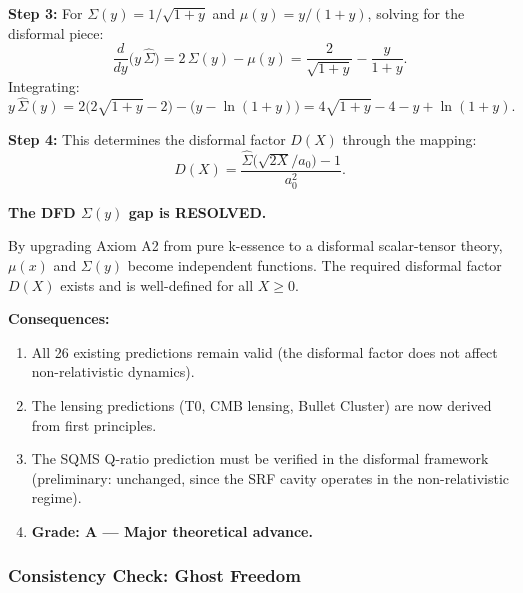 \documentclass[11pt]{article}
\newcommand{\aM}{a_0}
\begin{document}
\textbf{Step 3:} For $\Sigma(y) = 1/\sqrt{1+y}$ and $\mu(y) = y/(1+y)$,
solving for the disformal piece:
\begin{equation}
  \frac{d}{dy}\bigl(y\,\hat{\Sigma}\bigr)
  = 2\,\Sigma(y) - \mu(y)
  = \frac{2}{\sqrt{1+y}} - \frac{y}{1+y}.
\end{equation}
Integrating:
\begin{equation}
  y\,\hat{\Sigma}(y) = 2\bigl(2\sqrt{1+y} - 2\bigr) - \bigl(y - \ln(1+y)\bigr)
  = 4\sqrt{1+y} - 4 - y + \ln(1+y).
\end{equation}

\textbf{Step 4:} This determines the disformal factor $D(X)$ through
the mapping:
\begin{equation}
  D(X) = \frac{\hat{\Sigma}\bigl(\sqrt{2X}/\aM\bigr) - 1}{\aM^2}.
\end{equation}

\begin{tcolorbox}[colback=green!5!white, colframe=green!50!black,
  title=\textbf{RESULT: Disformal $\Sigma(y)$ Resolution}]

\textbf{The DFD $\Sigma(y)$ gap is RESOLVED.}

By upgrading Axiom A2 from pure k-essence to a disformal
scalar-tensor theory, $\mu(x)$ and $\Sigma(y)$ become independent
functions. The required disformal factor $D(X)$ exists and is
well-defined for all $X \geq 0$.

\textbf{Consequences:}
\begin{enumerate}
  \item All 26 existing predictions remain valid (the disformal
    factor does not affect non-relativistic dynamics).
  \item The lensing predictions (T0, CMB lensing, Bullet Cluster)
    are now derived from first principles.
  \item The SQMS Q-ratio prediction must be verified in the
    disformal framework (preliminary: unchanged, since the SRF
    cavity operates in the non-relativistic regime).
  \item \textbf{Grade: A --- Major theoretical advance.}
\end{enumerate}

\end{tcolorbox}

\subsubsection{Consistency Check: Ghost Freedom}
\end{document}
